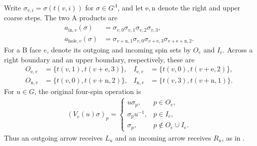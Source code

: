 \begin{definition}
    \label{def:peps_qd_original_actions}

    Write $\sigma_{v,i}=\sigma(t(v,i))$ for $\sigma\in G^\Lambda$,
    and let $\mathrm e,\mathrm n$ denote the right and upper coarse steps.
    The two A products are
    \begin{align}
        a_{\mathrm{in},v}(\sigma)
          &=\sigma_{v,0}\sigma_{v,1}\sigma_{v,2}\sigma_{v,3},\\
        a_{\mathrm{hole},v}(\sigma)
          &=\sigma_{v+\mathrm n,1}\sigma_{v,0}
            \sigma_{v+\mathrm e,3}\sigma_{v+\mathrm e+\mathrm n,2}.
        \label{eq:peps_qd_original_a}
    \end{align}
    For a B face $e$, denote its outgoing and incoming spin sets by
    $O_e$ and $I_e$. Across a right boundary and an upper boundary,
    respectively, these are
    \begin{align}
        O_{\mathrm e,v}&=\{t(v,1),t(v+\mathrm e,3)\},&
        I_{\mathrm e,v}&=\{t(v,0),t(v+\mathrm e,2)\},\\
        O_{\mathrm n,v}&=\{t(v,0),t(v+\mathrm n,2)\},&
        I_{\mathrm n,v}&=\{t(v,3),t(v+\mathrm n,1)\}.
        \label{eq:peps_qd_original_incidence}
    \end{align}
    For $u\in G$, the original four-spin operation is
    \begin{align}
        (V_e(u)\sigma)_p=
        \begin{cases}
            u\sigma_p,&p\in O_e,\\
            \sigma_pu^{-1},&p\in I_e,\\
            \sigma_p,&p\notin O_e\cup I_e.
        \end{cases}
        \label{eq:peps_qd_original_action}
    \end{align}
    Thus an outgoing arrow receives $L_u$ and an incoming arrow receives
    $R_u$, as in \cite[Section~7.2]{Schuch2010PEPS}.
\end{definition}

